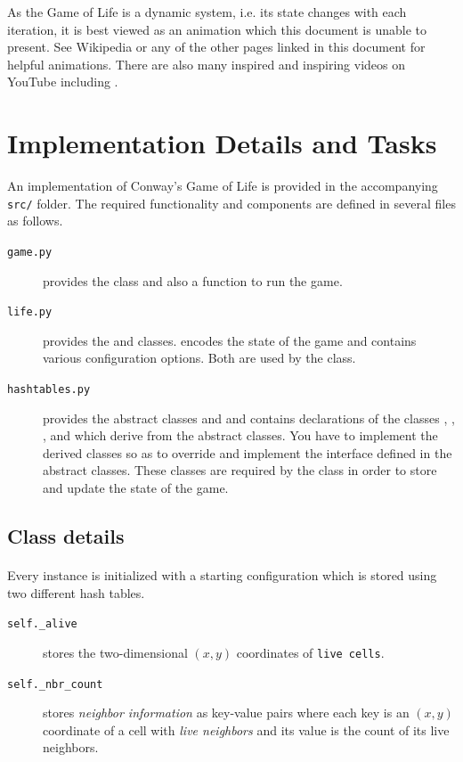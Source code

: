\documentclass[addpoints]{exam}
\begin{document}
As the Game of Life is a dynamic system, i.e. its state changes with each iteration, it is best viewed as an animation which this document is unable to present. See Wikipedia \cite{wp_gol} or any of the other pages linked in this document for helpful animations. There are also many inspired and inspiring videos on YouTube including \cite{yt_gol}.

\section{Implementation Details and Tasks}

An implementation of Conway's Game of Life is provided in the accompanying \texttt{src/} folder. The required functionality and components are defined in several files as follows.
\begin{description}
\item[\texttt{game.py}] provides the  class and also a  function to run the game.
\item[\texttt{life.py}] provides the  and  classes.  encodes the state of the game and  contains various configuration options. Both are used by the  class.
\item[\texttt{hashtables.py}] provides the abstract classes  and  and contains declarations of the classes , , , and  which derive from the abstract classes. You have to implement the derived classes so as to override and implement the interface defined in the abstract classes. These classes are required by the  class in order to store and update the state of the game.
\end{description}

\subsection{Class details}

\paragraph{} Every instance is initialized with a starting configuration which is stored using two different hash tables.
\begin{description}
\item[\texttt{self.\_alive}] stores the two-dimensional $(x,y)$ coordinates of \texttt{live cells}.
\item[\texttt{self.\_nbr\_count}] stores \textit{neighbor information} as key-value pairs where each key is an $(x,y)$ coordinate of a cell with \textit{live neighbors} and its value is the count of its live neighbors.
\end{description}
\end{document}
